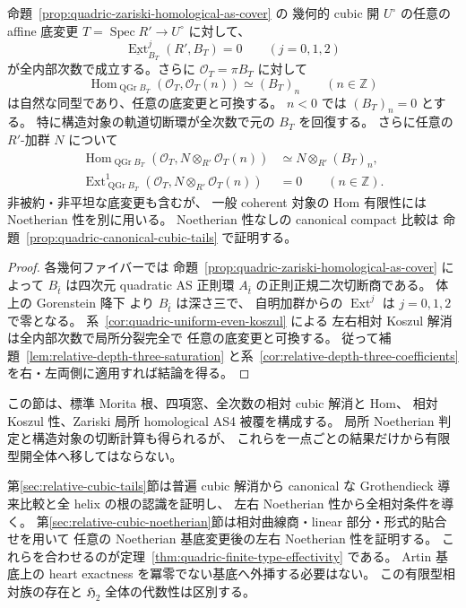 \begin{corollary}
\label{cor:quadric-all-basechange-saturated-sections}
命題~\ref{prop:quadric-zariski-homological-as-cover} の
幾何的 cubic 開 $U^\circ$ の任意の affine 底変更
$T=\operatorname{Spec}R'\to U^\circ$ に対して、
\[
 \underline{\operatorname{Ext}}_{B_T}^j(R',B_T)=0
 \qquad(j=0,1,2)
\]
が全内部次数で成立する。さらに $\mathcal O_T=\pi B_T$ に対して
\[
 \operatorname{Hom}_{\operatorname{QGr}B_T}
       (\mathcal O_T,\mathcal O_T(n))
 \simeq (B_T)_n\qquad(n\in\mathbb Z)
 \tag{Quadric-H0}\label{eq:quadric-relative-full-sections}
\]
は自然な同型であり、任意の底変更と可換する。
$n<0$ では $(B_T)_n=0$ とする。
特に構造対象の軌道切断環が全次数で元の $B_T$ を回復する。
さらに任意の $R'$-加群 $N$ について
\begin{align*}
 \operatorname{Hom}_{\operatorname{QGr}B_T}
   (\mathcal O_T,N\otimes_{R'}\mathcal O_T(n))
   &\simeq N\otimes_{R'}(B_T)_n,\\
 \operatorname{Ext}^1_{\operatorname{QGr}B_T}
   (\mathcal O_T,N\otimes_{R'}\mathcal O_T(n))&=0
 \qquad(n\in\mathbb Z).
\end{align*}
非被約・非平坦な底変更も含むが、
一般 coherent 対象の Hom 有限性には Noetherian 性を別に用いる。
Noetherian 性なしの canonical compact 比較は
命題~\ref{prop:quadric-canonical-cubic-tails} で証明する。
\end{corollary}
\begin{proof}
各幾何ファイバーでは
命題~\ref{prop:quadric-zariski-homological-as-cover}
によって $B_{\bar t}$ は四次元 quadratic AS 正則環
$A_{\bar t}$ の正則正規二次切断商である。
体上の Gorenstein 降下
\cite[\S2.8]{SVdB2013}
より $B_{\bar t}$ は深さ三で、
自明加群からの $\operatorname{Ext}^j$ は
$j=0,1,2$ で零となる。
系~\ref{cor:quadric-uniform-even-koszul} による
左右相対 Koszul 解消は全内部次数で局所分裂完全で
任意の底変更と可換する。
従って補題~\ref{lem:relative-depth-three-saturation}
と系~\ref{cor:relative-depth-three-coefficients}
を右・左両側に適用すれば結論を得る。
\end{proof}

\begin{remark}[有限型相対実現への依存関係]
この節は、標準 Morita 根、四項窓、全次数の相対 cubic 解消と Hom、
相対 Koszul 性、Zariski 局所 homological AS4 被覆を構成する。
局所 Noetherian 判定と構造対象の切断計算も得られるが、
これらを一点ごとの結果だけから有限型開全体へ移してはならない。

第\ref{sec:relative-cubic-tails}節は普遍 cubic 解消から
canonical な Grothendieck 導来比較と全 helix の根の認識を証明し、
左右 Noetherian 性から全相対条件を導く。
第\ref{sec:relative-cubic-noetherian}節は相対曲線商・linear 部分・形式的貼合せを用いて
任意の Noetherian 基底変更後の左右 Noetherian 性を証明する。
これらを合わせるのが定理~\ref{thm:quadric-finite-type-effectivity} である。
Artin 基底上の heart exactness を冪零でない基底へ外挿する必要はない。
この有限型相対族の存在と $\mathfrak H_2$ 全体の代数性は区別する。
\end{remark}
